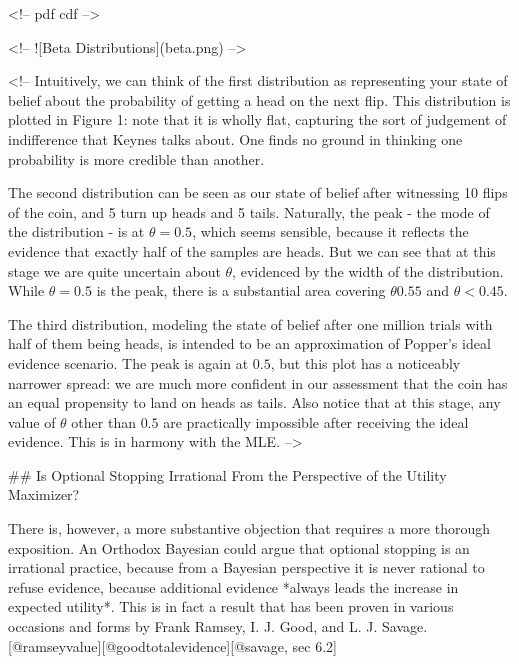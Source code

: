 \textless{}!-- pdf cdf --\textgreater{}

\textless{}!-- !{[}Beta Distributions{]}(beta.png) --\textgreater{}

\textless{}!-- Intuitively, we can think of the first distribution as
representing your state of belief about the probability of getting a
head on the next flip. This distribution is plotted in Figure 1: note
that it is wholly flat, capturing the sort of judgement of indifference
that Keynes talks about. One finds no ground in thinking one probability
is more credible than another.

The second distribution can be seen as our state of belief after
witnessing 10 flips of the coin, and 5 turn up heads and 5 tails.
Naturally, the peak - the mode of the distribution - is at
\(\theta = 0.5\), which seems sensible, because it reflects the evidence
that exactly half of the samples are heads. But we can see that at this
stage we are quite uncertain about \(\theta\), evidenced by the width of
the distribution. While \(\theta = 0.5\) is the peak, there is a
substantial area covering \(\theta 0.55\) and \(\theta < 0.45\).

The third distribution, modeling the state of belief after one million
trials with half of them being heads, is intended to be an approximation
of Popper's ideal evidence scenario. The peak is again at \(0.5\), but
this plot has a noticeably narrower spread: we are much more confident
in our assessment that the coin has an equal propensity to land on heads
as tails. Also notice that at this stage, any value of \(\theta\) other
than \(0.5\) are practically impossible after receiving the ideal
evidence. This is in harmony with the MLE. --\textgreater{}

\#\# Is Optional Stopping Irrational From the Perspective of the Utility
Maximizer?

There is, however, a more substantive objection that requires a more
thorough exposition. An Orthodox Bayesian could argue that optional
stopping is an irrational practice, because from a Bayesian perspective
it is never rational to refuse evidence, because additional evidence
*always leads the increase in expected utility*. This is in fact a
result that has been proven in various occasions and forms by Frank
Ramsey, I. J. Good, and L. J. Savage.
{[}@ramseyvalue{]}{[}@goodtotalevidence{]}{[}@savage, sec 6.2{]}

